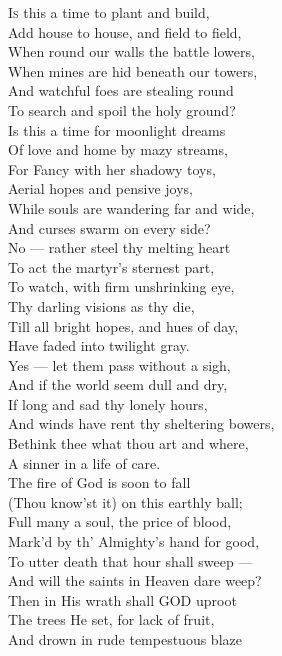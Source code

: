 \textsc{Is} this a time to plant and build, \\
 Add house to house, and field to field, \\
 When round our walls the battle lowers, \\
 When mines are hid beneath our towers, \\
 And watchful foes are stealing round \\
 To search and spoil the holy ground? \\
  Is this a time for moonlight dreams \\
 Of love and home by mazy streams, \\
 For Fancy with her shadowy toys, \\
 Aerial hopes and pensive joys, \\
 While souls are wandering far and wide, \\
 And curses swarm on every side? \\
  No — rather steel thy melting heart \\
 To act the martyr’s sternest part, \\
 To watch, with firm unshrinking eye, \\
 Thy darling visions as thy die, \\
 Till all bright hopes, and hues of day, \\
 Have faded into twilight gray. \\
  Yes — let them pass without a sigh, \\
 And if the world seem dull and dry, \\
 If long and sad thy lonely hours, \\
 And winds have rent thy sheltering bowers, \\
 Bethink thee what thou art and where, \\
 A sinner in a life of care. \\
  The fire of God is soon to fall \\
 (Thou know’st it) on this earthly ball; \\
 Full many a soul, the price of blood, \\
 Mark’d by th’ Almighty’s hand for good, \\
 To utter death that hour shall sweep — \\
 And will the saints in Heaven dare weep? \\
  Then in His wrath shall GOD uproot \\
 The trees He set, for lack of fruit, \\
 And drown in rude tempestuous blaze \\
